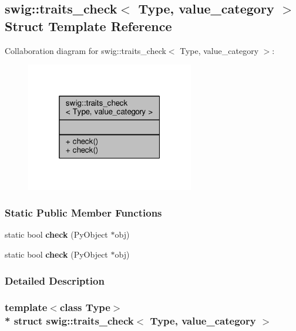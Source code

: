 \subsection{swig\+:\+:traits\+\_\+check$<$ Type, value\+\_\+category $>$ Struct Template Reference}
\label{structswig_1_1traits__check_3_01Type_00_01value__category_01_4}


Collaboration diagram for swig\+:\+:traits\+\_\+check$<$ Type, value\+\_\+category $>$\+:
\nopagebreak
\begin{figure}[H]
\begin{center}
\leavevmode
\includegraphics[width=208pt]{d4/dcb/structswig_1_1traits__check_3_01Type_00_01value__category_01_4__coll__graph}
\end{center}
\end{figure}
\subsubsection*{Static Public Member Functions}
\begin{DoxyCompactItemize}
\item 
static bool {\bf check} (Py\+Object $\ast$obj)
\item 
static bool {\bf check} (Py\+Object $\ast$obj)
\end{DoxyCompactItemize}


\subsubsection{Detailed Description}
\subsubsection*{template$<$class Type$>$\\*
struct swig\+::traits\+\_\+check$<$ Type, value\+\_\+category $>$}



